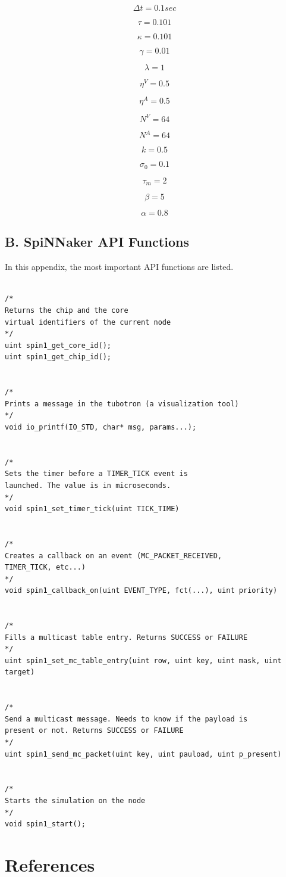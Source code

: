 \documentclass{article}
\begin{document}
\begin{multicols}{2}
\[ 
\Delta t = 0.1 sec
\]

\[
\tau = 0.101
\]

\[
\kappa = 0.101
\]

\[
\gamma = 0.01
\]

\[
\lambda = 1
\]

\[
\eta^{V} = 0.5
\]

\[
\eta^{A} = 0.5
\]

\[
N^{V} = 64
\]


\[
N^{A} = 64
\]

\[
k = 0.5
\]

\[
\sigma_{0} = 0.1
\]

\[
\tau_{m} = 2
\]

\[
\beta = 5
\]

\[ 
\alpha = 0.8
\]
\end{multicols}

\subsection*{B. SpiNNaker API Functions}
In this appendix, the most important API functions are listed.
\begin{verbatim}

/*
Returns the chip and the core 
virtual identifiers of the current node
*/
uint spin1_get_core_id();
uint spin1_get_chip_id();


/*
Prints a message in the tubotron (a visualization tool)
*/
void io_printf(IO_STD, char* msg, params...);


/*
Sets the timer before a TIMER_TICK event is
launched. The value is in microseconds.
*/
void spin1_set_timer_tick(uint TICK_TIME)

	
/*
Creates a callback on an event (MC_PACKET_RECEIVED,
TIMER_TICK, etc...)
*/
void spin1_callback_on(uint EVENT_TYPE, fct(...), uint priority)


/*
Fills a multicast table entry. Returns SUCCESS or FAILURE
*/
uint spin1_set_mc_table_entry(uint row, uint key, uint mask, uint target)


/*
Send a multicast message. Needs to know if the payload is
present or not. Returns SUCCESS or FAILURE
*/
uint spin1_send_mc_packet(uint key, uint pauload, uint p_present)


/*
Starts the simulation on the node
*/
void spin1_start();
\end{verbatim}


\section{References}
\end{document}
